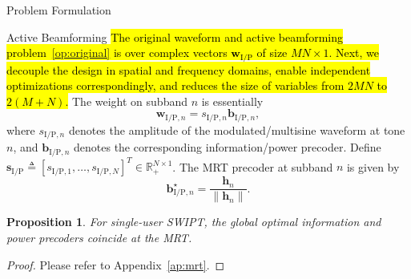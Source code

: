 \documentclass[journal,12pt,onecolumn,draftclsnofoot]{IEEEtran}
\newtheorem{proposition}{Proposition}
\begin{document}
\begin{section}{Problem Formulation}
		\begin{subsection}{Active Beamforming}
			\hl{The original waveform and active beamforming problem~\eqref{op:original} is over complex vectors $\boldsymbol{w}_{\mathrm{I/P}}$ of size $MN \times 1$. Next, we decouple the design in spatial and frequency domains, enable independent optimizations correspondingly, and reduces the size of variables from $2MN$ to $2(M+N)$.} The weight on subband $n$ is essentially
			\begin{equation}\label{eq:w}
				\boldsymbol{w}_{\mathrm{I/P}, n} = s_{\mathrm{I/P}, n} \boldsymbol{b}_{\mathrm{I/P}, n},
			\end{equation}
			where $s_{\mathrm{I/P},n}$ denotes the amplitude of the modulated/multisine waveform at tone $n$, and $\boldsymbol{b}_{\mathrm{I/P}, n}$ denotes the corresponding information/power precoder. Define $\boldsymbol{s}_{\mathrm{I/P}} \triangleq [s_{\mathrm{I/P},1},\dots,s_{\mathrm{I/P},N}]^T \in \mathbb{R}_+^{N \times 1}$. The MRT precoder at subband $n$ is given by
			\begin{equation}\label{eq:b_n}
				\boldsymbol{b}_{\mathrm{I/P}, n}^\star = \frac{\boldsymbol{h}_n}{\lVert{\boldsymbol{h}_n}\rVert}.
			\end{equation}

			\begin{proposition}\label{pr:mrt}
				For single-user SWIPT, the global optimal information and power precoders coincide at the MRT.
			\end{proposition}

			\begin{proof}\label{pf:mrt}
				Please refer to Appendix~\ref{ap:mrt}.
			\end{proof}
		\end{subsection}



\end{section}
\end{document}
